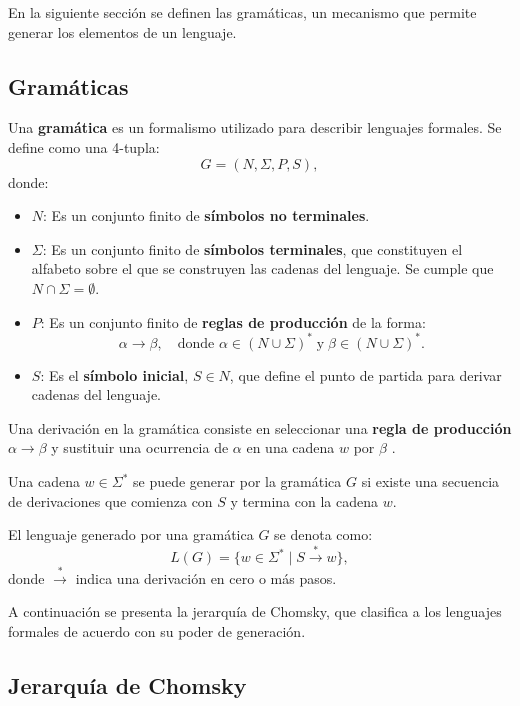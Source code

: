 En la siguiente sección se definen las gramáticas, un mecanismo que permite generar los elementos de un lenguaje.

\subsection{Gramáticas}
\label{sec:grammars}

\begin{definition}
  Una \textbf{gramática} es un formalismo utilizado para describir lenguajes formales. Se define como una 4-tupla:
  \[
    G = (N, \Sigma, P, S),
  \]
  donde:
  \begin{itemize}
    \item \(N\): Es un conjunto finito de \textbf{símbolos no terminales}.
    \item \(\Sigma\): Es un conjunto finito de \textbf{símbolos terminales}, que constituyen el alfabeto sobre el que se construyen las cadenas del lenguaje. Se cumple que \(N \cap \Sigma = \emptyset\).
    \item \(P\): Es un conjunto finito de \textbf{reglas de producción} de la forma:
          \[
            \alpha \to \beta, \quad \text{donde } \alpha \in (N \cup \Sigma)^* \;\text{y}\; \beta \in (N \cup \Sigma)^*.
          \]
          
    \item \(S\): Es el \textbf{símbolo inicial}, \(S \in N\), que define el punto de partida para derivar cadenas del lenguaje.
  \end{itemize}
\end{definition}


Una derivación en la gramática consiste en seleccionar una \textbf{regla de producción} $\alpha \to \beta$ y sustituir una ocurrencia de 
$\alpha$ en una cadena $w$ por $\beta$ \cite{authomataTheory}.

Una cadena $w\in\Sigma^*$  se puede generar por la gramática $G$ si existe una secuencia de derivaciones que comienza con $S$
y termina con la cadena $w$.

El lenguaje generado por una gramática \(G\) se denota como:
\[
  L(G) = \{ w \in \Sigma^* \mid S \overset{*}{\to} w \},
\]
donde \(\overset{*}{\to}\) indica una derivación en cero o más pasos.

A continuación se presenta la jerarquía de Chomsky, que clasifica a los lenguajes formales de acuerdo con su poder de generación.

\subsection{Jerarquía de Chomsky}

